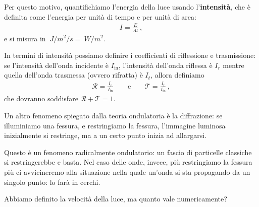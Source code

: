 \documentclass[a4paper,12pt]{article}
\begin{document}
Per questo motivo, quantifichiamo l'energia della luce usando l'\textbf{intensità}, che è definita come l'energia per unità di tempo e per unità di area: 
%
\begin{align}
I = \frac{E}{A t}
\,,
\end{align}
%
e si misura in \(\SI{}{J / m^2 / s}  = \SI{}{W/m^2}\). 

In termini di intensità possiamo definire i coefficienti di riflessione e trasmissione: se l'intensità dell'onda incidente è \(I _{\text{in}}\), l'intensità dell'onda riflessa è \(I_{r}\) mentre quella dell'onda trasmessa (ovvero rifratta) è \(I_{t}\), allora definiamo 
%
\begin{align}
\mathcal{R} = \frac{I_r}{I _{\text{in}}}
\qquad \text{e} \qquad
\mathcal{T} = \frac{I_t}{I _{\text{in}}}
\,,
\end{align}
%
che dovranno soddisfare \(\mathcal{R} + \mathcal{T} = 1\).

Un altro fenomeno spiegato dalla teoria ondulatoria è la diffrazione: se illuminiamo una fessura, e restringiamo la fessura, l'immagine luminosa inizialmente si restringe, ma a un certo punto inizia ad allargarsi.

Questo è un fenomeno radicalmente ondulatorio: un fascio di particelle classiche si restringerebbe e basta.
Nel caso delle onde, invece, più restringiamo la fessura più ci avvicineremo alla situazione nella quale un'onda si sta propagando da un singolo punto: lo farà in cerchi. 

Abbiamo definito la velocità della luce, ma quanto vale numericamente? 
\end{document}

